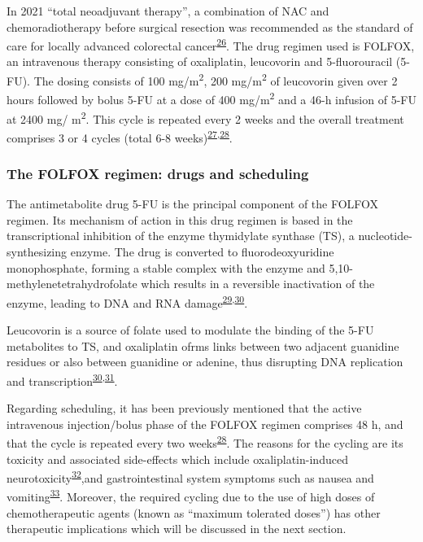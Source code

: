 \documentclass[11pt]{umnthesis}
\begin{document}
In 2021 ``total neoadjuvant therapy'', a combination of NAC and chemoradiotherapy before surgical resection was recommended as the standard of care for locally advanced colorectal cancer\textsuperscript{\protect\hyperlink{ref-venook2021}{26}}. The drug regimen used is FOLFOX, an intravenous therapy consisting of oxaliplatin, leucovorin and 5-fluorouracil (5-FU). The dosing consists of 100 mg/m\textsuperscript{2}, 200 mg/m\textsuperscript{2} of leucovorin given over 2 hours followed by bolus 5-FU at a dose of 400 mg/m\textsuperscript{2} and a 46-h infusion of 5-FU at 2400 mg/ m\textsuperscript{2}. This cycle is repeated every 2 weeks and the overall treatment comprises 3 or 4 cycles (total 6-8 weeks)\textsuperscript{\protect\hyperlink{ref-kato2010}{27},\protect\hyperlink{ref-karoui2015}{28}}.

\hypertarget{the-folfox-regimen-drugs-and-scheduling}{%
\subsubsection{The FOLFOX regimen: drugs and scheduling}\label{the-folfox-regimen-drugs-and-scheduling}}

The antimetabolite drug 5-FU is the principal component of the FOLFOX regimen. Its mechanism of action in this drug regimen is based in the transcriptional inhibition of the enzyme thymidylate synthase (TS), a nucleotide-synthesizing enzyme. The drug is converted to fluorodeoxyuridine monophosphate, forming a stable complex with the enzyme and 5,10-methylenetetrahydrofolate which results in a reversible inactivation of the enzyme, leading to DNA and RNA damage\textsuperscript{\protect\hyperlink{ref-housman2014}{29},\protect\hyperlink{ref-longley2003}{30}}.

Leucovorin is a source of folate used to modulate the binding of the 5-FU metabolites to TS, and oxaliplatin ofrms links between two adjacent guanidine residues or also between guanidine or adenine, thus disrupting DNA replication and transcription\textsuperscript{\protect\hyperlink{ref-longley2003}{30},\protect\hyperlink{ref-arango2004}{31}}.

Regarding scheduling, it has been previously mentioned that the active intravenous injection/bolus phase of the FOLFOX regimen comprises 48 h, and that the cycle is repeated every two weeks\textsuperscript{\protect\hyperlink{ref-karoui2015}{28}}. The reasons for the cycling are its toxicity and associated side-effects which include oxaliplatin-induced neurotoxicity\textsuperscript{\protect\hyperlink{ref-tsai2016}{32}},and gastrointestinal system symptoms such as nausea and vomiting\textsuperscript{\protect\hyperlink{ref-wielahojeska2015}{33}}. Moreover, the required cycling due to the use of high doses of chemotherapeutic agents (known as ``maximum tolerated doses'') has other therapeutic implications which will be discussed in the next section.
\end{document}
